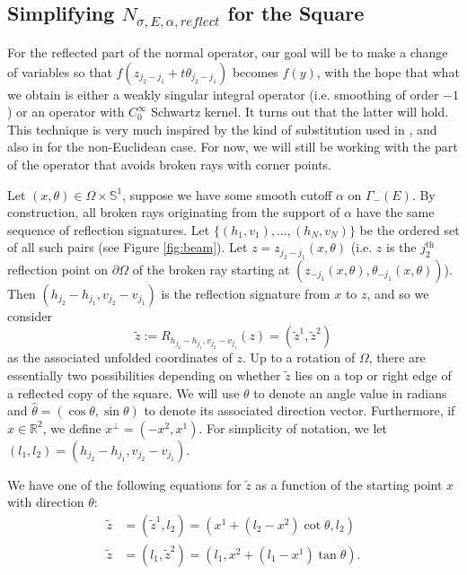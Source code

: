 \documentclass[10pt]{amsart}
\theoremstyle{definition}
\theoremstyle{definition}
\theoremstyle{definition}
\newcommand{ \rn }[1]{\mathbb{R}^{#1}}
\begin{document}
\subsection{Simplifying $N_{\sigma,E,\alpha,reflect}$ for the Square \label{sec:normalsimplify}}
For the reflected part of the normal operator, our goal will be to make a change of variables so that $f(z_{j_{2}-j_{1}} + t\theta_{j_{2}-j_{1}})$ becomes $f(y)$, with the hope that what we obtain is either a weakly singular integral operator (i.e. smoothing of order $-1$) or an operator with $C_{0}^{\infty}$ Schwartz kernel. It turns out that the latter will hold. This technique is very much inspired by the kind of substitution used in \cite{inversesource, hubenthal}, and also in \cite{xraygeneric} for the non-Euclidean case. For now, we will still be working with the part of the operator that avoids broken rays with corner points.

Let $(x,\theta) \in \Omega \times \mathbb{S}^{1}$, suppose we have some smooth cutoff $\alpha$ on $\Gamma_{-}(E)$. By construction, all broken rays originating from the support of $\alpha$ have the same sequence of reflection signatures. Let $\{(h_{1},v_{1}), \ldots, (h_{N},v_{N})\}$ be the ordered set of all such pairs (see Figure \ref{fig:beam}). Let $z = z_{j_{2}-j_{1}}(x,\theta)$ (i.e. $z$ is the $j_{2}^{\mathrm{th}}$ reflection point on $\partial \Omega$ of the broken ray starting at $(z_{-j_{1}}(x,\theta), \theta_{-j_{1}}(x,\theta))$). Then $(h_{j_{2}}-h_{j_{1}}, v_{j_{2}}-v_{j_{1}})$ is the reflection signature from $x$ to $z$, and so we consider 
\begin{equation*}
\widetilde{z} := R_{h_{j_{2}}-h_{j_{1}},v_{j_{2}}-v_{j_{1}}}(z) =  (\widetilde{z}^{1}, \widetilde{z}^{2})
\end{equation*}
as the associated unfolded coordinates of $z$. Up to a rotation of $\Omega$, there are essentially two possibilities depending on whether $\widetilde{z}$ lies on a top or right edge of a reflected copy of the square. We will use $\theta$ to denote an angle value in radians and $\widehat{\theta} = (\cos{\theta}, \sin{\theta})$ to denote its associated direction vector. Furthermore, if $x \in \rn{2}$, we define $x^{\perp} = (-x^{2},x^{1})$. For simplicity of notation, we let $(l_{1},l_{2}) = (h_{j_{2}}-h_{j_{1}}, v_{j_{2}}-v_{j_{1}})$.

We have one of the following equations for $\widetilde{z}$ as a function of the starting point $x$ with direction $\theta$:
\begin{align}
\widetilde{z} & = (\widetilde{z}^{1}, l_{2}) = (x^{1} + (l_{2} - x^{2})\cot{\theta}, l_{2})\\
\widetilde{z} & = (l_{1}, \widetilde{z}^{2}) = (l_{1}, x^{2} + (l_{1} - x^{1})\tan{\theta}).
\end{align}
\end{document}

